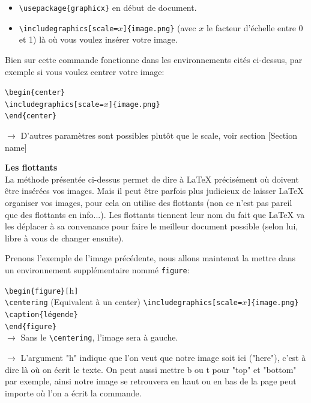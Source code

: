 \documentclass[11pt]{article}				%
\newcommand{\tb}{\textbackslash}
\newcommand{\cmdo}[3][]{\texttt{\textbackslash #2}\texttt{[#1}\texttt{]\{#3\}}}
\newcommand{\cmd}[2]{\texttt{\textbackslash #1}\texttt{\{#2\}}}
\begin{document}
\begin{itemize}
	\item \cmd{usepackage}{graphicx} en début de document.
	\item \cmdo[scale=$x$]{includegraphics}{image.png} \quad (avec $x$ le facteur d'échelle entre 0 et 1) là où vous voulez insérer votre image.
\end{itemize}


Bien sur cette commande fonctionne dans les environnements cités ci-dessus, par exemple si vous voulez centrer votre image: \\


\begin{multicols}{2}
\cmd{begin}{center}\\
\cmdo[scale=$x$]{includegraphics}{image.png} \\
\cmd{end}{center}\\

\columnbreak

$\rightarrow$ D'autres paramètres sont possibles plutôt que le scale, voir section [Section name]
\end{multicols}


\textbf{Les flottants}\\

La méthode présentée ci-dessus permet de dire à LaTeX précisément où doivent être insérées vos images. Mais il peut être parfois plus judicieux de laisser LaTeX organiser vos images, pour cela on utilise des flottants (non ce n'est pas pareil que des flottants en info...). Les flottants tiennent leur nom du fait que LaTeX va les déplacer à sa convenance pour faire le meilleur document possible (selon lui, libre à vous de changer ensuite).\\

\pagebreak

Prenons l'exemple de l'image précédente, nous allons maintenat la mettre dans un environnement supplémentaire nommé \texttt{figure}: \\

\begin{multicols}{2}
\cmd{begin}{figure}\texttt{[}h\texttt{]}\\
\texttt{\tb centering} \quad (Equivalent à un center)
\cmdo[scale=$x$]{includegraphics}{image.png} \\
\cmd{caption}{légende}\\
\cmd{end}{figure}\\
$\rightarrow$ Sans le \texttt{\tb centering}, l'image sera à gauche. 

\columnbreak

$\rightarrow$ L'argument "h" indique que l'on veut que notre image soit ici ("here"), c'est à dire là où on écrit le texte. On peut aussi mettre b ou t pour "top" et "bottom" par exemple, ainsi notre image se retrouvera en haut ou en bas de la page peut importe où l'on a écrit la commande.
\end{multicols}
\end{document}
